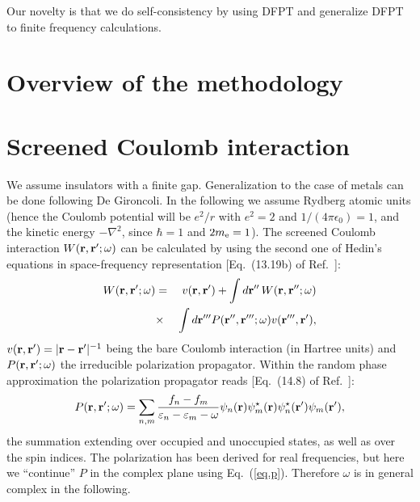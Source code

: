 \documentclass[twocolumn,prb,showpacs,superscriptaddress]{revtex4}
\def\w{\omega}
\def\E{\varepsilon}
\def\r{{\bf r}}
\def\rp{{\bf r^\prime}}
\def\rpp{{\bf r^{\prime\prime}}}
\def\rppp{{\bf r^{\prime\prime\prime}}}
\begin{document}
Our novelty is that we do self-consistency by using DFPT
and generalize DFPT to finite frequency calculations.

\section{Overview of the methodology}

\section{Screened Coulomb interaction}

We assume insulators with a finite gap. Generalization to the case of metals
can be done following De Gironcoli.
In the following we assume Rydberg atomic units (hence the Coulomb potential
will be $e^2/r$ with $e^2=2$ and $1/(4\pi\epsilon_0)=1$, and the kinetic energy $-\nabla^2$, since $\hbar=1$ 
and $2m_{\rm e}=1$).
The screened Coulomb interaction $W(\r,\rp;\w)$ can be calculated by using
the second one of Hedin's equations in space-frequency representation
[Eq.\ (13.19b) of Ref.~]:
  \begin{eqnarray}\label{eq.w}
  W(\r,\rp;\w) & = & v(\r,\rp) + \int d\rpp \,W(\r,\rpp;\w)  \nonumber \\
   & \times & \int d\rppp P(\rpp,\rppp;\w) v(\rppp,\rp), 
  \end{eqnarray}
$v(\r,\rp)=|\r-\rp|^{-1}$ being the bare Coulomb interaction (in Hartree units) and
$P(\r,\rp;\w)$ the irreducible polarization propagator. 
Within the random phase approximation the polarization propagator reads 
[Eq.\ (14.8) of Ref.~]:
  \begin{equation}\label{eq.p}
  P(\r,\rp;\w) = \sum_{n,m} \frac{f_n-f_m}{\E_n-\E_m-\w} 
  \psi_n(\r)\psi_m^\star(\r)  \psi_n^\star(\rp)\psi_m(\rp),
  \end{equation}
the summation extending over occupied and unoccupied states, as well as
over the spin indices.\cite{note.w.even}
The polarization has been derived for real frequencies, but here we ``continue''
$P$ in the complex plane using Eq.\ (\ref{eq.p}). Therefore $\w$ is in general complex
in the following.
\end{document}
